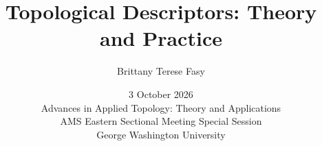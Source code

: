 \documentclass{beamer}
\title[Topological Descriptors]{
Topological Descriptors: Theory and Practice
}
\author[BTF]{Brittany Terese Fasy}
\institute[MSU]{Montana State University}
\date[3 Octoberl 2026]{3 October 2026\\
    Advances in Applied Topology: Theory and Applications\\
    AMS Eastern Sectional Meeting Special Session\\
    George Washington University}
\begin{document}
\begin{frame}
\titlepage
\end{frame}











%


\end{document}
